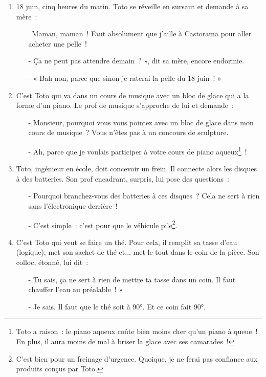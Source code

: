 \documentclass[10pt,a5paper,fullpage]{book}
\begin{document}
\begin{enumerate}
		\item 18 juin, cinq heures du matin. Toto se réveille en sursaut et demande à sa mère~:
		\begin{itemize}
			\item[ ] \guillemotleft~Maman, maman~! Faut absolument que j’aille à Castorama pour aller acheter une pelle~!
			\item[-] Ça ne peut pas attendre demain~? », dit sa mère, encore endormie.
			\item[-] « Bah non, parce que sinon je raterai la pelle du 18 juin~! » 
		\end{itemize}
		
		\item C’est Toto qui va dans un cours de musique avec un bloc de glace qui a la forme d’un piano. Le prof de musique s’approche de lui et demande~:
		\begin{itemize}
			\item[-] Monsieur, pourquoi vous vous pointez avec un bloc de glace dans mon cours de musique~? Vous n’êtes pas à un concours de sculpture.
			\item[-] Ah, parce que je voulais participer à votre cours de piano aqueux\footnote{Toto a raison~: le piano aqueux coûte bien moins cher qu’un piano à queue~! En plus, il aura moins de mal à briser la glace avec ses camarades~!}~!
		\end{itemize}
		
		\item Toto, ingénieur en école, doit concevoir un frein. Il connecte alors les disques à des batteries. Son prof encadrant, surpris, lui pose des questions~:
		\begin{itemize}
			\item[-] Pourquoi branchez-vous des batteries à ces disques~? Cela ne sert à rien sans l'électronique derrière~!
			\item[-] C'est simple~: c'est pour que le véhicule pile\footnote{C'est bien pour un freinage d'urgence. Quoique, je ne ferai pas confiance aux produits conçus par Toto.}.
		\end{itemize}
		
		\item C’est Toto qui veut se faire un thé. Pour cela, il remplit sa tasse d’eau (logique), met son sachet de thé et... met le tout dans le coin de la pièce. Son colloc, étonné, lui dit~:
		\begin{itemize}
			\item[-] Tu sais, ça ne sert à rien de mettre ta tasse dans un coin. Il faut chauffer l’eau au préalable~! »
			\item[-] Je sais. Il faut que le thé soit à 90°. Et ce coin fait 90°.  
		\end{itemize}
		

\end{enumerate}
\end{document}
